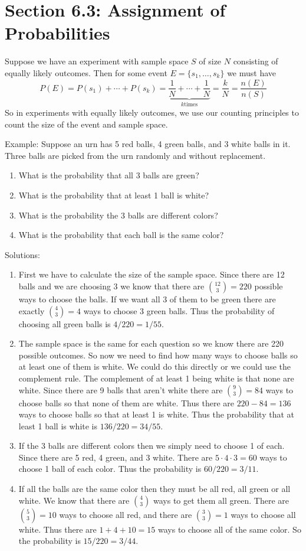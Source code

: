 \documentclass[14,fleqn]{article}
\begin{document}
\section{Section 6.3: Assignment of Probabilities}
Suppose we have an experiment with sample space $S$ of size $N$ consisting of equally likely outcomes. Then for some event $E=\{s_1,\dots,s_k\}$ we must have
\[
	P(E)=P(s_1)+\cdots +P(s_k)=\underbrace{\frac{1}{N}+\cdots + \frac{1}{N}}_{k \mathrm{ times}}=\frac{k}{N}=\frac{n(E)}{n(S)}
\]
So in experiments with equally likely outcomes, we use our counting principles to count the size of the event and sample space.

Example: Suppose an urn has 5 red balls, 4 green balls, and 3 white balls in it. Three balls are picked from the urn randomly and without replacement.
\begin{enumerate}
	\item What is the probability that all 3 balls are green?
	\item What is the probability that at least 1 ball is white?
	\item What is the probability the 3 balls are different colors?
	\item What is the probability that each ball is the same color?
\end{enumerate}

Solutions:\\
\begin{enumerate}
	\item First we have to calculate the size of the sample space. Since there are 12 balls and we are choosing 3 we know that there are $\binom{12}{3}=220$ possible ways to choose the balls. If we want all 3 of them to be green there are exactly $\binom{4}{3}=4$ ways to choose 3 green balls. Thus the probability of choosing all green balls is $4/220=1/55.$
	\item The sample space is the same for each question so we know there are 220 possible outcomes. So now we need to find how many ways to choose balls so at least one of them is white. We could do this directly or we could use the complement rule. The complement of at least 1 being white is that none are white. Since there are 9 balls that aren't white there are $\binom{9}{3}=84$ ways to choose balls so that none of them are white. Thus there are $220-84=136$ ways to choose balls so that at least 1 is white. Thus the probability that at least 1 ball is white is $136/220=34/55.$
	\item If the 3 balls are different colors then we simply need to choose 1 of each. Since there are 5 red, 4 green, and 3 white. There are $5\cdot 4\cdot 3=60$ ways to choose 1 ball of each color. Thus the probability is $60/220=3/11.$
	\item If all the balls are the same color then they must be all red, all green or all white. We know that there are $\binom{4}{3}$ ways to get them all green. There are $\binom{5}{3}=10$ ways to choose all red, and there are $\binom{3}{3}=1$ ways to choose all white. Thus there are $1+4+10=15$ ways to choose all of the same color. So the probability is $15/220=3/44.$
\end{enumerate}
\end{document}
